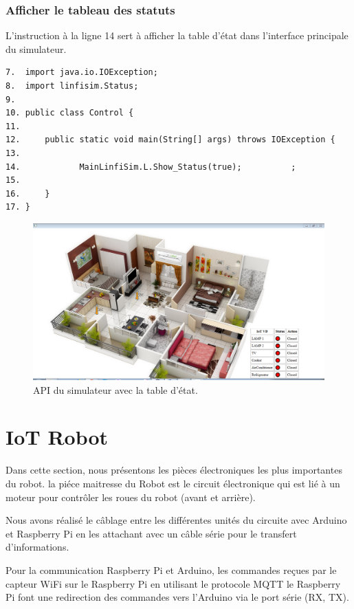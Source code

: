 \subsubsection{Afficher le tableau des statuts}
L'instruction à la ligne 14 sert à afficher la table d'état dans l'interface principale du simulateur.
\begin{lstlisting}
7.	import java.io.IOException;
8.	import linfisim.Status;
9.	
10.	public class Control {
11.	
12.	    public static void main(String[] args) throws IOException {
13.	
14.	           MainLinfiSim.L.Show_Status(true);          ;
15.	           
16.	    }
17.	}

\end{lstlisting}
\begin{figure}[H]
    \centering
    \includegraphics[scale=0.4]{chap1/fc23.png}
    \caption{API du simulateur avec la table d'état.}
    \label{fc23}
\end{figure}
\section{IoT Robot}

Dans cette section, nous présentons les pièces électroniques les plus importantes du robot. la piéce maitresse du Robot est le circuit électronique qui est lié à un moteur pour contrôler les roues du robot (avant et arrière). 

Nous avons réalisé le câblage entre les différentes unités du circuite  avec Arduino et Raspberry Pi en les attachant avec un câble série pour le transfert d'informations. 

Pour la communication Raspberry Pi et Arduino, les commandes reçues par le capteur WiFi sur le Raspberry Pi en utilisant le protocole MQTT le Raspberry Pi font une redirection des commandes vers l'Arduino via le port série (RX, TX).


